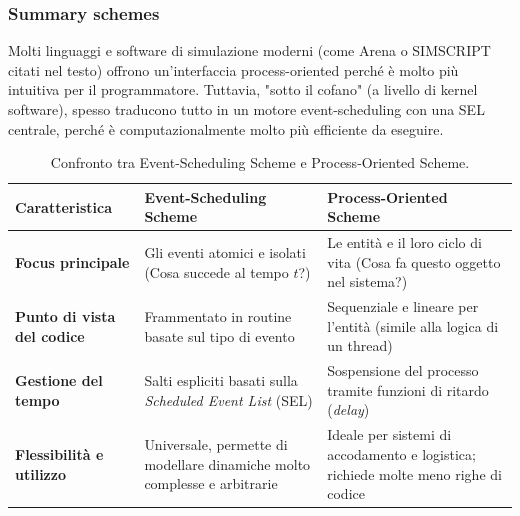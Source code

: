 \subsubsection{Summary schemes}
Molti linguaggi e software di simulazione moderni (come Arena o SIMSCRIPT citati nel testo) offrono un'interfaccia process-oriented perché è molto più intuitiva per il programmatore. Tuttavia, "sotto il cofano" (a livello di kernel software), spesso traducono tutto in un motore event-scheduling con una SEL centrale, perché è computazionalmente molto più efficiente da eseguire.

\begin{table}[H]
	\centering
	\caption{Confronto tra Event-Scheduling Scheme e Process-Oriented Scheme.}
	\label{tab:scheduling_schemes}
	\begin{tabularx}{\textwidth}{l X X}
		\toprule
		\textbf{Caratteristica} & \textbf{Event-Scheduling Scheme} & \textbf{Process-Oriented Scheme} \\
		\midrule
		\textbf{Focus principale} & Gli eventi atomici e isolati (Cosa succede al tempo $t$?) & Le entità e il loro ciclo di vita (Cosa fa questo oggetto nel sistema?) \\
		\addlinespace
		\textbf{Punto di vista del codice} & Frammentato in routine basate sul tipo di evento & Sequenziale e lineare per l'entità (simile alla logica di un thread) \\
		\addlinespace
		\textbf{Gestione del tempo} & Salti espliciti basati sulla \emph{Scheduled Event List} (SEL) & Sospensione del processo tramite funzioni di ritardo (\emph{delay}) \\
		\addlinespace
		\textbf{Flessibilità e utilizzo} & Universale, permette di modellare dinamiche molto complesse e arbitrarie & Ideale per sistemi di accodamento e logistica; richiede molte meno righe di codice \\
		\bottomrule
	\end{tabularx}
\end{table}